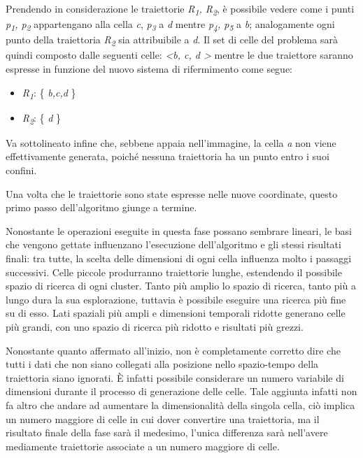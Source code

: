 Prendendo in considerazione le traiettorie \textit{R\textsubscript{1}, R\textsubscript{2}}, è possibile vedere come i punti \textit{p\textsubscript{1}, p\textsubscript{2}} appartengano alla cella \textit{c},
\textit{p\textsubscript{3}} a \textit{d} mentre \textit{p\textsubscript{4}, p\textsubscript{5}} a \textit{b}; analogamente ogni punto della traiettoria \textit{R\textsubscript{2}} sia attribuibile a \textit{d}.
Il set di celle del problema sarà quindi composto dalle seguenti celle: \textit{\textless b, c, d \textgreater} mentre le due traiettore saranno espresse in funzione del nuovo sistema di rifermimento come segue:

\begin{itemize}

  \item \textit{R\textsubscript{1}}: \{ \textit{b,c,d} \}
  \item \textit{R\textsubscript{2}}: \{ \textit{d} \}

\end{itemize}

Va sottolineato infine che, sebbene appaia nell'immagine, la cella \textit{a} non viene effettivamente generata, poiché nessuna traiettoria ha un punto entro i suoi confini.

Una volta che le traiettorie sono state espresse nelle nuove coordinate, questo primo passo dell'algoritmo giunge a termine.

Nonostante le operazioni eseguite in questa fase possano sembrare lineari, le basi che vengono gettate influenzano l'esecuzione dell'algoritmo e gli stessi risultati finali:
tra tutte, la scelta delle dimensioni di ogni cella influenza molto i passaggi successivi. Celle piccole produrranno traiettorie lunghe, estendendo il possibile spazio di ricerca di ogni cluster.
Tanto più amplio lo spazio di ricerca, tanto più a lungo dura la sua esplorazione, tuttavia è possibile eseguire una ricerca più fine su di esso.
Lati spaziali più ampli e dimensioni temporali ridotte generano celle più grandi, con uno spazio di ricerca più ridotto e risultati più grezzi.

Nonostante quanto affermato all'inizio, non è completamente corretto dire che tutti i dati che non siano collegati alla posizione nello spazio-tempo della traiettoria siano ignorati.
È infatti possibile considerare un numero variabile di dimensioni durante il processo di generazione delle celle. Tale aggiunta infatti non fa altro che andare ad aumentare la dimensionalità della singola cella,
ciò implica un numero maggiore di celle in cui dover convertire una traiettoria, ma il risultato finale della fase sarà il medesimo, l'unica differenza sarà nell'avere mediamente traiettorie
associate a un numero maggiore di celle.

